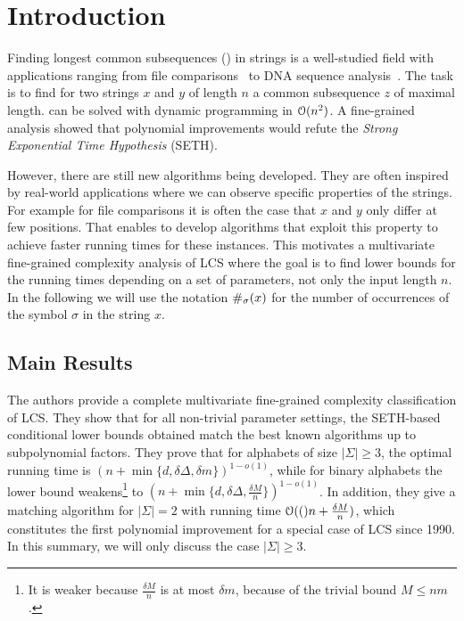 \section{Introduction}
Finding longest common subsequences (\lcs{}) in strings is a well-studied field with applications ranging from file comparisons~\cite{Hunt.1976,Miller.1985} to DNA sequence analysis~\cite{Altschul.1990}.
The task is to find for two strings $x$ and $y$ of length $n$ a common subsequence $z$ of maximal length.
\lcs{} can be solved with dynamic programming in $\mathcal{O}(n^2)$. 
A fine-grained analysis showed that polynomial improvements would refute the \emph{Strong Exponential Time Hypothesis} (SETH)\cite{Abboud.28.01.2015,Bringmann.2015}.

However, there are still new algorithms being developed.
They are often inspired by real-world applications where we can observe specific properties of the strings.
For example for file comparisons it is often the case that $x$ and $y$ only differ at few positions.
That enables to develop algorithms that exploit this property to achieve faster running times for these instances.
This motivates a multivariate fine-grained complexity analysis of LCS where the goal is to find lower bounds for the running times depending on a set of parameters, not only the input length $n$.
%
In the following we will use the notation $\#_{\sigma}(x)$ for the number of occurrences of the symbol $\sigma$ in the string $x$.


\subsection{Main Results}
The authors provide a complete multivariate fine-grained complexity classification of LCS. 
They show that for all non-trivial parameter settings, the SETH-based conditional lower bounds obtained match the best known algorithms up to subpolynomial factors.
They prove that for alphabets of size $|\Sigma|\geq 3$, the optimal running time is $(n + \min\{d, \delta \Delta, \delta m\})^{1 - o(1)}$, while for binary alphabets the lower bound weakens\footnote{It is weaker because $\frac{\delta M}{n}$ is at most $\delta m$, because of the trivial bound $M \leq nm$.} to $(n + \min\{d, \delta \Delta, \tfrac{\delta M}{n}\})^{1-o(1)}$. 
In addition, they give a matching algorithm for $|\Sigma|=2$ with running time $\mathcal{O}(()n + \tfrac{\delta M}{n})$, which constitutes the first polynomial improvement for a special case of LCS since 1990.
In this summary, we will only discuss the case $|\Sigma| \geq 3$.

